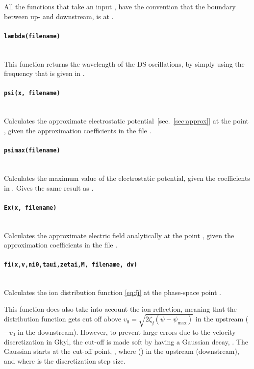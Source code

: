 \documentclass[11pt,a4paper, 
swedish, english %
]{article}
\begin{document}
All the functions that take an input , have the convention
that the boundary between up- and downstream, is at .

\paragraph{\texttt{lambda(filename)}}\mbox{}\\
This function returns the wavelength of the DS oscillations, by
simply using the frequency that is given in .

\paragraph{\texttt{psi(x, filename)}}\mbox{}\\
Calculates the approximate electrostatic
potential~[sec.~\ref{sec:approx}] at the point , given the
approximation coefficients in the file . 

\paragraph{\texttt{psimax(filename)}}\mbox{}\\
Calculates the maximum value of the electrostatic potential, given the
coefficients in . Gives the same result as
. 

\paragraph{\texttt{Ex(x, filename)}}\mbox{}\\
Calculates the approximate electric field analytically at the point
, given the approximation coefficients in the file
. 

\paragraph{\texttt{fi(x,v,ni0,taui,zetai,M, filename, dv)}}\mbox{}\\
Calculates the ion distribution function \eqref{eq:fj} at the
phase-space point .

This function does also take into account the ion reflection, meaning
that the distribution function gets cut off above
$v_0=\sqrt{2\zeta_{\jj}(\psi-\psi_{\max})}$ in the upstream
($-v_0$ in the downstream). However, to prevent large errors due to
the velocity discretization in Gkyl, the cut-off is made soft by
having a Gaussian decay, . The
Gaussian starts at the cut-off point, , where
 () in the upstream (downstream), and where
 is the discretization step size.
\end{document}
